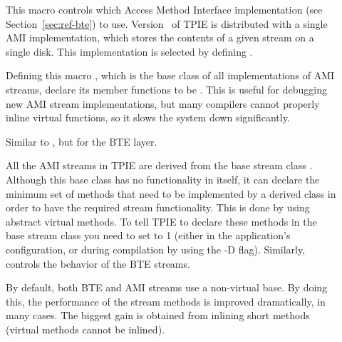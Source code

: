 \begin{description}
    \item[{}] This macro controls
    which Access Method Interface implementation (see
    Section~\ref{sec:ref-bte}) to use. Version \version~of
    TPIE is distributed with a single AMI implementation,
    which stores the contents of a given stream on a single
    disk. This implementation is selected by defining
    . 
  
  \item[{}] Defining this macro
  , which is the base class of all
  implementations of AMI streams, declare its member
  functions to be . This is useful for
  debugging new AMI stream implementations, but many
  compilers cannot properly inline virtual functions, so it
  slows the system down significantly.
  
  \item[{}] Similar to
  , but for the BTE layer.
  
  All the AMI streams in TPIE are 
  derived from the base stream class
  . Although this base class has
  no functionality in itself, it can declare the minimum set
  of methods that need to be implemented by a derived class
  in order to have the required stream functionality. This
  is done by using abstract virtual methods. To tell TPIE to
  declare these methods in the base stream class you need to
  set  to 1 (either in the
  application's configuration, or during compilation by
  using the -D flag). Similarly, 
  controls the behavior of the BTE streams.
  
  By default, both BTE and AMI streams use a non-virtual
  base. By doing this, the performance of the stream methods
  is improved dramatically, in many cases. The biggest gain
  is obtained from inlining short methods (virtual methods
  cannot be inlined).



\end{description}
